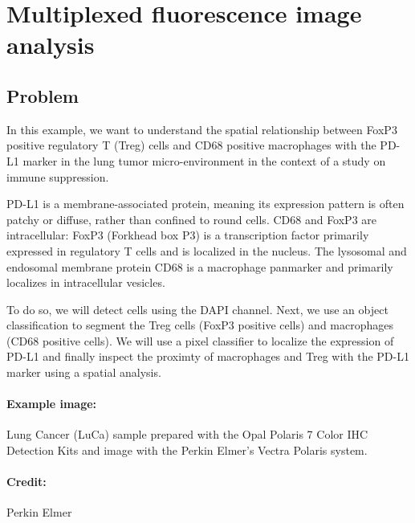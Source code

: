 \documentclass[a4paper,DIV=17,dvipsnames,headsepline]{scrartcl}
\begin{document}
\section{Multiplexed fluorescence image analysis}

\subsection{Problem}

In this example, we want to understand the spatial relationship between FoxP3 positive regulatory T (Treg) cells and CD68 positive macrophages with the PD-L1 marker in the lung tumor micro-environment in the context of a study on immune suppression.

PD-L1 is a membrane-associated protein, meaning its expression pattern is often patchy or diffuse, rather than confined to round cells. CD68 and FoxP3 are intracellular: FoxP3 (Forkhead box P3) is a transcription factor primarily expressed in regulatory T cells and is localized in the nucleus. The lysosomal and endosomal membrane protein CD68 is a macrophage panmarker and primarily localizes in intracellular vesicles. 


To do so, we will detect cells using the DAPI channel. Next, we use an object classification to segment the Treg cells (FoxP3 positive cells) and macrophages (CD68 positive cells).  We will use a pixel classifier to localize the expression of PD-L1 and finally inspect the proximty of macrophages and Treg with the PD-L1 marker using a spatial analysis. 

\paragraph{Example image:}
Lung Cancer (LuCa) sample prepared with the Opal Polaris 7 Color IHC Detection Kits and image with the Perkin Elmer’s Vectra Polaris system.


\paragraph{Credit:} Perkin Elmer
\end{document}

